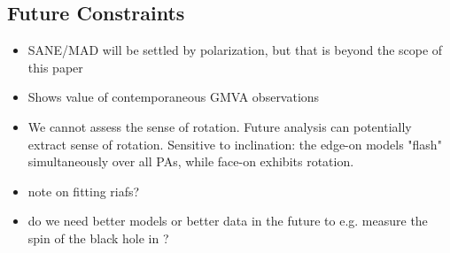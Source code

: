 \subsection{Future Constraints}\label{sec:future}

\begin{itemize}

\item SANE/MAD will be settled by polarization, but that is beyond the scope of this paper

\item Shows value of contemporaneous GMVA observations

\item We cannot assess the sense of rotation.
Future analysis can potentially extract sense of rotation.  Sensitive to inclination: the edge-on models "flash" simultaneously over all PAs, while face-on exhibits rotation.

\item note on fitting riafs?

\item do we need better models or better data in the future to e.g. measure the spin of the black hole in \sgra?

\end{itemize}

